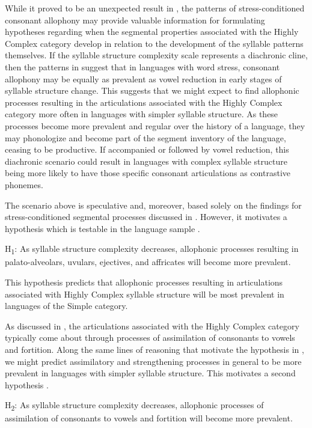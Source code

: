   While it proved to be an unexpected result in , the patterns of stress-conditioned consonant allophony may provide valuable information for formulating hypotheses regarding when the segmental properties associated with the Highly Complex category develop in relation to the development of the syllable patterns themselves. If the syllable structure complexity scale represents a diachronic cline, then the patterns in  suggest that in languages with word stress, consonant allophony may be equally as prevalent as vowel reduction in early stages of syllable structure change. This suggests that we might expect to find allophonic processes resulting in the articulations associated with the Highly Complex category more often in languages with simpler syllable structure. As these processes become more prevalent and regular over the history of a language, they may phonologize and become part of the segment inventory of the language, ceasing to be productive. If accompanied or followed by vowel reduction, this diachronic scenario could result in languages with complex syllable structure being more likely to have those specific consonant articulations as contrastive phonemes.

  The scenario above is speculative and, moreover, based solely on the findings for stress-conditioned segmental processes discussed in . However, it motivates a hypothesis which is testable in the language sample .

\ea\label{ex:7.1}
  H\textsubscript{1}: As syllable structure complexity decreases, allophonic processes resulting in palato-alveolars, uvulars, ejectives, and affricates will become more prevalent.
\z

This hypothesis predicts that allophonic processes resulting in articulations associated with Highly Complex syllable structure will be most prevalent in languages of the Simple category.

  As discussed in , the articulations associated with the Highly Complex category typically come about through processes of assimilation of consonants to vowels and fortition. Along the same lines of reasoning that motivate the hypothesis in , we might predict assimilatory and strengthening processes in general to be more prevalent in languages with simpler syllable structure. This motivates a second hypothesis .

\ea\label{ex:7.2}
  H\textsubscript{2}: As syllable structure complexity decreases, allophonic processes of assimilation of consonants to vowels and fortition will become more prevalent.
\z

